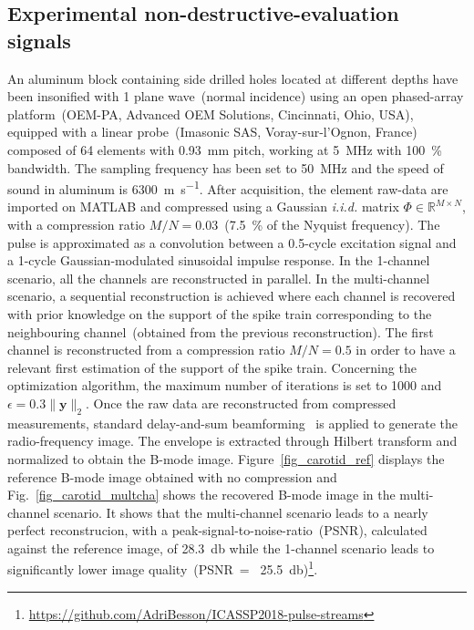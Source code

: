 \documentclass{article}
\newcommand{\vect}[1]{\bm{#1}}
\newcommand{\mat}[1]{\mathsf{#1}}
\theoremstyle{definition}
\begin{document}
\subsection{Experimental non-destructive-evaluation signals}
\label{subsec_invivo_images}
An aluminum block containing side drilled holes located at different depths have been insonified with 1 plane wave~(normal incidence) using an open phased-array platform~(OEM-PA, Advanced OEM Solutions, Cincinnati, Ohio, USA), equipped with a linear probe~(Imasonic SAS, Voray-sur-l'Ognon, France) composed of \num{64} elements with \SI{0.93}{\milli\metre} pitch, working at \SI{5}{\mega\hertz} with \SI{100}{\percent} bandwidth. The sampling frequency has been set to \SI{50}{\mega\hertz} and the speed of sound in aluminum is \SI{6300}{\meter\per\second}. 
After acquisition, the element raw-data are imported on MATLAB and compressed using a Gaussian \textit{i.i.d.} matrix $\mat{\Phi} \in \mathbb{R}^{M \times N}$, with a compression ratio $M/N = 0.03$~(\SI{7.5}{\percent} of the Nyquist frequency). The pulse is approximated as a convolution between a \num{0.5}-cycle excitation signal and a \num{1}-cycle Gaussian-modulated sinusoidal impulse response. 
In the 1-channel scenario, all the channels are reconstructed in parallel. In the multi-channel scenario, a sequential reconstruction is achieved where each channel is recovered with prior knowledge on the support of the spike train corresponding to the neighbouring channel~(obtained from the previous reconstruction). The first channel is reconstructed from a compression ratio $M/N = 0.5$ in order to have a relevant first estimation of the support of the spike train. Concerning the optimization algorithm, the maximum number of iterations is set to \num{1000} and $\epsilon = 0.3 \| \vect{y} \|_2$. 
Once the raw data are reconstructed from compressed measurements, standard delay-and-sum beamforming~\cite{montaldo_uffc_2014} is applied to generate the radio-frequency image. The envelope is extracted through Hilbert transform and normalized to obtain the B-mode image. 
Figure~\ref{fig_carotid_ref} displays the reference B-mode image obtained with no compression and Fig.~\ref{fig_carotid_multcha} shows the recovered B-mode image in the multi-channel scenario. It shows that the multi-channel scenario leads to a nearly perfect reconstrucion, with a peak-signal-to-noise-ratio~(PSNR), calculated against the reference image, of \SI{28.3}{\decibel} while the \num{1}-channel scenario leads to significantly lower image quality~(PSNR~=~ \SI{25.5}{\decibel})\footnote{\scriptsize{\url{https://github.com/AdriBesson/ICASSP2018-pulse-streams}}}.
\end{document}
